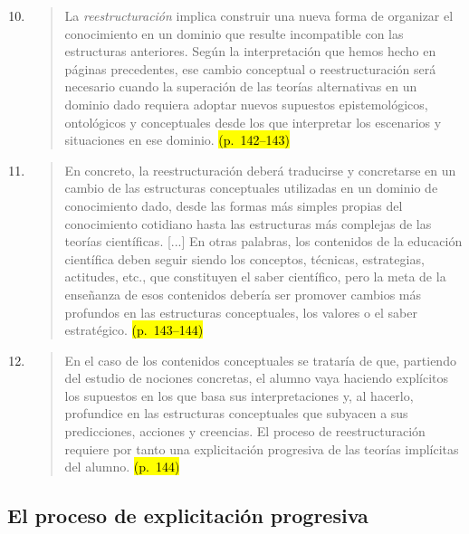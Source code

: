 \documentclass{article}
\begin{document}
\begin{enumerate}
  \setcounter{enumi}{9}

  \item
  \begin{quote}
  La \textit{reestructuración} implica construir una nueva forma de organizar el conocimiento en un dominio que resulte incompatible con las estructuras anteriores. Según la interpretación que hemos hecho en páginas precedentes, ese cambio conceptual o reestructuración será necesario cuando la superación de las teorías alternativas en un dominio dado requiera adoptar nuevos supuestos epistemológicos, ontológicos y conceptuales desde los que interpretar los escenarios y situaciones en ese dominio. \hl{(p.~142–143)}
  \end{quote}

  \item
  \begin{quote}
  En concreto, la reestructuración deberá traducirse y concretarse en un cambio de las estructuras conceptuales utilizadas en un dominio de conocimiento dado, desde las formas más simples propias del conocimiento cotidiano hasta las estructuras más complejas de las teorías científicas. [...] En otras palabras, los contenidos de la educación científica deben seguir siendo los conceptos, técnicas, estrategias, actitudes, etc., que constituyen el saber científico, pero la meta de la enseñanza de esos contenidos debería ser promover cambios más profundos en las estructuras conceptuales, los valores o el saber estratégico. \hl{(p.~143–144)}
  \end{quote}

  \item
  \begin{quote}
  En el caso de los contenidos conceptuales se trataría de que, partiendo del estudio de nociones concretas, el alumno vaya haciendo explícitos los supuestos en los que basa sus interpretaciones y, al hacerlo, profundice en las estructuras conceptuales que subyacen a sus predicciones, acciones y creencias. El proceso de reestructuración requiere por tanto una explicitación progresiva de las teorías implícitas del alumno. \hl{(p.~144)}
  \end{quote}
\end{enumerate}


\subsection*{El proceso de explicitación progresiva}
\end{document}
